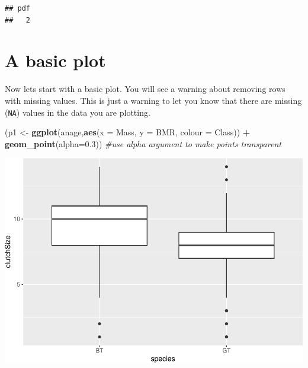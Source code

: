 \documentclass[
  a4paperpaper,
]{book}
\newenvironment{Shaded}{\begin{snugshade}}{\end{snugshade}}
\newcommand{\CommentTok}[1]{\textcolor[rgb]{0.56,0.35,0.01}{\textit{#1}}}
\newcommand{\DataTypeTok}[1]{\textcolor[rgb]{0.13,0.29,0.53}{#1}}
\newcommand{\FloatTok}[1]{\textcolor[rgb]{0.00,0.00,0.81}{#1}}
\newcommand{\KeywordTok}[1]{\textcolor[rgb]{0.13,0.29,0.53}{\textbf{#1}}}
\newcommand{\NormalTok}[1]{#1}
\newcommand{\OperatorTok}[1]{\textcolor[rgb]{0.81,0.36,0.00}{\textbf{#1}}}
\newcommand{\StringTok}[1]{\textcolor[rgb]{0.31,0.60,0.02}{#1}}
\begin{document}
\begin{Shaded}
\end{Shaded}

\begin{verbatim}
## pdf 
##   2
\end{verbatim}

\hypertarget{a-basic-plot}{%
\section{A basic plot}\label{a-basic-plot}}

Now lets start with a basic plot. You will see a warning about removing rows with missing values. This is just a warning to let you know that there are missing (\texttt{NA}) values in the data you are plotting.

\begin{Shaded}
\begin{Highlighting}[]
\NormalTok{(p1 \textless{}{-}}\StringTok{ }\KeywordTok{ggplot}\NormalTok{(anage,}\KeywordTok{aes}\NormalTok{(}\DataTypeTok{x =}\NormalTok{ Mass, }\DataTypeTok{y =}\NormalTok{ BMR, }\DataTypeTok{colour =}\NormalTok{ Class)) }\OperatorTok{+}\StringTok{ }
\StringTok{  }\KeywordTok{geom\_point}\NormalTok{(}\DataTypeTok{alpha=}\FloatTok{0.3}\NormalTok{)) }\CommentTok{\#use alpha argument to make points transparent}
\end{Highlighting}
\end{Shaded}

\begin{center}\includegraphics{BB852_files/figure-latex/unnamed-chunk-110-1} \end{center}
\end{document}
